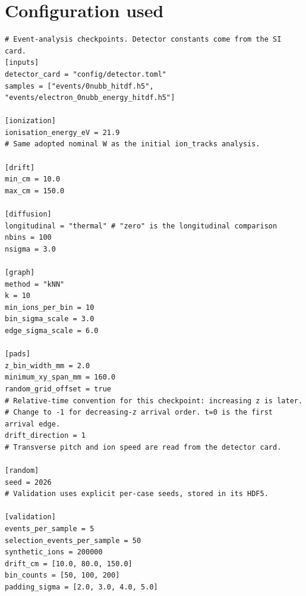 \documentclass[11pt]{article}
\begin{document}
\section*{Configuration used}
\footnotesize\begin{verbatim}
# Event-analysis checkpoints. Detector constants come from the SI card.
[inputs]
detector_card = "config/detector.toml"
samples = ["events/0nubb_hitdf.h5", "events/electron_0nubb_energy_hitdf.h5"]

[ionization]
ionisation_energy_eV = 21.9
# Same adopted nominal W as the initial ion_tracks analysis.

[drift]
min_cm = 10.0
max_cm = 150.0

[diffusion]
longitudinal = "thermal" # "zero" is the longitudinal comparison
nbins = 100
nsigma = 3.0

[graph]
method = "kNN"
k = 10
min_ions_per_bin = 10
bin_sigma_scale = 3.0
edge_sigma_scale = 6.0

[pads]
z_bin_width_mm = 2.0
minimum_xy_span_mm = 160.0
random_grid_offset = true
# Relative-time convention for this checkpoint: increasing z is later.
# Change to -1 for decreasing-z arrival order. t=0 is the first arrival edge.
drift_direction = 1
# Transverse pitch and ion speed are read from the detector card.

[random]
seed = 2026
# Validation uses explicit per-case seeds, stored in its HDF5.

[validation]
events_per_sample = 5
selection_events_per_sample = 50
synthetic_ions = 200000
drift_cm = [10.0, 80.0, 150.0]
bin_counts = [50, 100, 200]
padding_sigma = [2.0, 3.0, 4.0, 5.0]

\end{verbatim}
\end{document}
